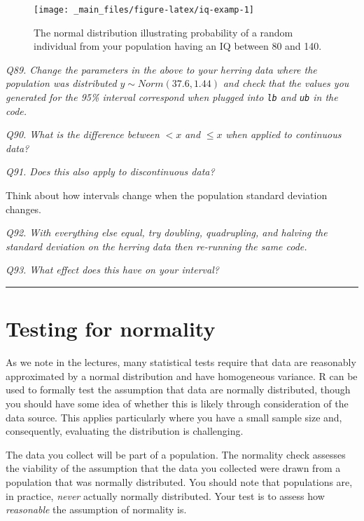 \documentclass[
  11pt,
  a4paper,
]{book}
\begin{document}
\begin{figure}

{\centering \texttt{[image: \_main\_files/figure-latex/iq-examp-1]} 

}

\caption{The normal distribution illustrating probability of a random individual from your population having an IQ between 80 and 140.}\label{fig:iq-examp}
\end{figure}

\emph{Q89. Change the parameters in the above to your herring data where the population was distributed} \(y \sim Norm(37.6, 1.44)\) \emph{and check that the values you generated for the 95\% interval correspond when plugged into \texttt{lb} and \texttt{ub} in the code.}

\emph{Q90. What is the difference between} \(< x\) \emph{and} \(\leq x\) \emph{when applied to continuous data?}

\emph{Q91. Does this also apply to discontinuous data?}

Think about how intervals change when the population standard deviation changes.

\emph{Q92. With everything else equal, try doubling, quadrupling, and halving the standard deviation on the herring data then re-running the same code.}

\emph{Q93. What effect does this have on your interval?}

\begin{center}\rule{0.5\linewidth}{0.5pt}\end{center}

\hypertarget{testing-for-normality}{%
\section{Testing for normality}\label{testing-for-normality}}

As we note in the lectures, many statistical tests require that data are reasonably approximated by a normal distribution and have homogeneous variance. R can be used to formally test the assumption that data are normally distributed, though you should have some idea of whether this is likely through consideration of the data source. This applies particularly where you have a small sample size and, consequently, evaluating the distribution is challenging.

The data you collect will be part of a population. The normality check assesses the viability of the assumption that the data you collected were drawn from a population that was normally distributed. You should note that populations are, in practice, \emph{never} actually normally distributed. Your test is to assess how \emph{reasonable} the assumption of normality is.
\end{document}
